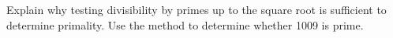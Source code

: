 Explain why testing divisibility by primes up to the square root is sufficient to determine primality. Use the method to determine whether 1009 is prime.
